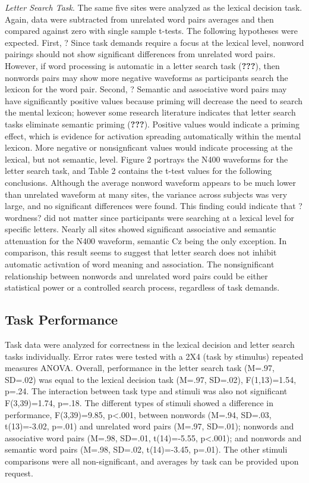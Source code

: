 \documentclass[english,man]{apa6}
\theoremstyle{definition}
\theoremstyle{definition}
\theoremstyle{definition}
\theoremstyle{remark}
\begin{document}
\emph{Letter Search Task}. The same five sites were analyzed as the
lexical decision task. Again, data were subtracted from unrelated word
pairs averages and then compared against zero with single sample
t-tests. The following hypotheses were expected. First, ? Since task
demands require a focus at the lexical level, nonword pairings should
not show significant differences from unrelated word pairs. However, if
word processing is automatic in a letter search task ({\textbf{???}}),
then nonwords pairs may show more negative waveforms as participants
search the lexicon for the word pair. Second, ? Semantic and associative
word pairs may have significantly positive values because priming will
decrease the need to search the mental lexicon; however some research
literature indicates that letter search tasks eliminate semantic priming
({\textbf{???}}). Positive values would indicate a priming effect, which
is evidence for activation spreading automatically within the mental
lexicon. More negative or nonsignficant values would indicate processing
at the lexical, but not semantic, level. Figure 2 portrays the N400
waveforms for the letter search task, and Table 2 contains the t-test
values for the following conclusions. Although the average nonword
waveform appears to be much lower than unrelated waveform at many sites,
the variance across subjects was very large, and no significant
differences were found. This finding could indicate that ?wordness? did
not matter since participants were searching at a lexical level for
specific letters. Nearly all sites showed significant associative and
semantic attenuation for the N400 waveform, semantic Cz being the only
exception. In comparison, this result seems to suggest that letter
search does not inhibit automatic activation of word meaning and
association. The nonsignificant relationship between nonwords and
unrelated word pairs could be either statistical power or a controlled
search process, regardless of task demands.

\subsection{Task Performance}\label{task-performance}

Task data were analyzed for correctness in the lexical decision and
letter search tasks individually. Error rates were tested with a 2X4
(task by stimulus) repeated measures ANOVA. Overall, performance in the
letter search task (M=.97, SD=.02) was equal to the lexical decision
task (M=.97, SD=.02), F(1,13)=1.54, p=.24. The interaction between task
type and stimuli was also not significant F(3,39)=1.74, p=.18. The
different types of stimuli showed a difference in performance,
F(3,39)=9.85, p\textless{}.001, between nonwords (M=.94, SD=.03,
t(13)=-3.02, p=.01) and unrelated word pairs (M=.97, SD=.01); nonwords
and associative word pairs (M=.98, SD=.01, t(14)=-5.55,
p\textless{}.001); and nonwords and semantic word pairs (M=.98, SD=.02,
t(14)=-3.45, p=.01). The other stimuli comparisons were all
non-significant, and averages by task can be provided upon request.
\end{document}
